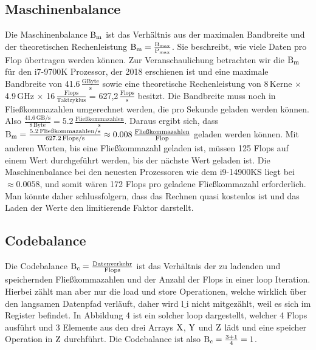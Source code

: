 \documentclass[sigconf,language=english]{acmart}
\begin{document}
    \subsection{Maschinenbalance}

    Die Maschinenbalance $\textnormal{B}_{\textnormal{m}}$ ist das Verhältnis 
    aus der maximalen Bandbreite und der theoretischen Rechenleistung
    $\textnormal{B}_{\textnormal{m}} = \frac{\textnormal{B}_{\textnormal{max}}}{\textnormal{P}_{\textnormal{max}}}$.
    Sie beschreibt, wie viele Daten pro Flop übertragen werden können. Zur Veranschaulichung 
    betrachten wir die $\textnormal{B}_{\textnormal{m}}$ für den i7-9700K Prozessor,     %
    der 2018 erschienen ist und eine maximale Bandbreite von 41.6\,$\frac{\text{GByte}}{\text{s}}$ sowie
    eine theoretische Rechenleistung von 8\,Kerne $\times$ 4.9\,GHz $\times$ 16\,$\frac{\text{Flops}}{\text{Taktzyklus}}$ = 627,2\,$\frac{\text{Flops}}{\text{s}}$ besitzt.
    Die Bandbreite muss noch in Fließkommazahlen umgerechnet werden, die pro Sekunde geladen werden können. Also
    $\frac{41.6 \, \text{GB/s}}{8 \, \text{Byte}} = 5.2 \, \frac{\text{Fließkommazahlen}}{\text{s}}$.
    Daraus ergibt sich, dass $\textnormal{B}_{\textnormal{m}} = \frac{5.2 \, \textnormal{Fließkommazahlen/s}}{627.2 \, \textnormal{Flops/s}} \approx 0.008\,\frac{\textnormal{Fließkommazahlen}}{\textnormal{Flop}}$
    geladen werden können. Mit anderen Worten, bis eine Fließkommazahl geladen ist, müssen
    125 Flops auf einem Wert durchgeführt werden, bis der nächste Wert geladen ist. 
    Die Maschinenbalance bei den neuesten Prozessoren wie dem i9-14900KS liegt bei $\approx 0.0058$, und somit wären 
    172 Flops pro geladene Fließkommazahl erforderlich. Man könnte daher schlussfolgern, 
    dass das Rechnen quasi kostenlos ist und das Laden der Werte den limitierende Faktor darstellt.

    \subsection{Codebalance}
    Die Codebalance $\textnormal{B}_{\textnormal{c}} = \frac{\textnormal{Datenverkehr}}{\textnormal{Flops}}$ ist das Verhältnis
    der zu ladenden und speichernden Fließkommazahlen und der Anzahl der Flops in einer loop Iteration. 
    Hierbei zählt man aber nur die load und store Operationen, welche wirklich über den langsamen Datenpfad verläuft, daher wird $\text{l\_i}$ nicht mitgezählt,
    weil es sich im Register befindet.
    In Abbildung 4 ist ein solcher loop dargestellt, %
    welcher 4 Flops ausführt und 3 Elemente aus den drei Arrays $\textnormal{X}$, $\textnormal{Y}$ und $\textnormal{Z}$ lädt 
    und eine speicher Operation in $\textnormal{Z}$ durchführt. Die Codebalance ist also $\textnormal{B}_{\textnormal{c}} = \frac{3+1}{4} = 1$. 
\end{document}
